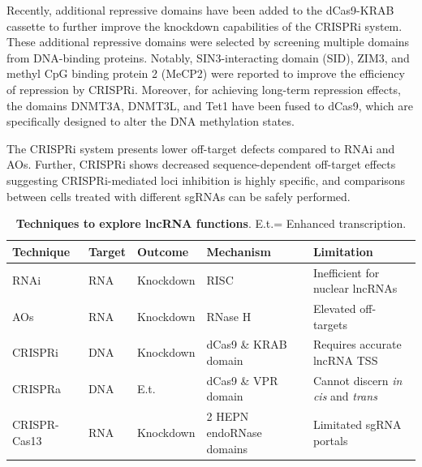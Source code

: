 Recently, additional repressive domains have been added to the dCas9-KRAB cassette to further improve the knockdown capabilities of the CRISPRi system. These additional repressive domains were selected by screening multiple domains from DNA-binding proteins. Notably, SIN3-interacting domain (SID), ZIM3, and methyl CpG binding protein 2 (MeCP2) were reported to improve the efficiency of repression by CRISPRi.\autocite{raffeiner_2020_sid_crispr,alerasool_2020_crispr_zim3} Moreover, for achieving long-term repression effects, the domains DNMT3A, DNMT3L, and Tet1 have been fused to dCas9, which are specifically designed to alter the DNA methylation states.\autocite{nunez_2021_crispr_epigenetics}

The CRISPRi system presents lower off-target defects compared to RNAi and AOs.\autocite{stojic_2018_specificity,morelli_2021_crispr,gao_2020_reverse_genetics} Further, CRISPRi shows decreased sequence-dependent off-target effects suggesting CRISPRi-mediated loci inhibition is highly specific, and comparisons between cells treated with different sgRNAs can be safely performed.\autocite{stojic_2018_specificity}

\begin{table}[!htb]
  \caption[Techniques to explore lncRNA functions]{\textbf{Techniques to explore lncRNA functions}. E.t.= Enhanced transcription.}
  \begin{scriptsize}
    \begin{tabulary}{0.65\linewidth}{lllll}
      \textbf{Technique} &  \textbf{Target} & \textbf{Outcome} & \textbf{Mechanism} & \textbf{Limitation} \\ \hline
      RNAi\autocite{morelli_2021_crispr,stojic_2018_specificity} &  RNA & Knockdown & RISC & Inefficient for nuclear lncRNAs \\
      AOs\autocite{stojic_2018_specificity,gao_2020_reverse_genetics} & RNA & Knockdown & RNase H & Elevated off-targets \\
      CRISPRi\autocite{gilbert_2013_crispri} & DNA & Knockdown & dCas9 \& KRAB domain & Requires accurate lncRNA TSS \\
      CRISPRa\autocite{morelli_2021_crispr} & DNA & E.t. & dCas9 \& VPR domain & Cannot discern \textit{in cis} and \textit{trans}\\
      CRISPR-Cas13\autocite{morelli_2021_crispr} & RNA & Knockdown & 2 HEPN endoRNase domains & Limitated sgRNA portals \\
    \end{tabulary}
  \end{scriptsize}
  \label{tab:reverse-genetics}
\end{table}

